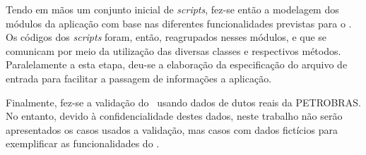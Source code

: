 Tendo em mãos um conjunto inicial de \textit{scripts}, fez-se então a modelagem dos módulos da aplicação com base nas diferentes funcionalidades previstas para o \frame.
Os códigos dos \textit{scripts} foram, então, reagrupados nesses módulos, e que se comunicam por meio da utilização das diversas classes e respectivos métodos.
Paralelamente a esta etapa, deu-se a elaboração da especificação do arquivo de entrada para facilitar a passagem de informações a aplicação.

Finalmente, fez-se a validação do \frame\ usando dados de dutos reais da PETROBRAS\@.
No entanto, devido à confidencialidade destes dados, neste trabalho não serão apresentados os casos usados a validação, mas casos com dados fictícios para exemplificar as funcionalidades do \frame.
